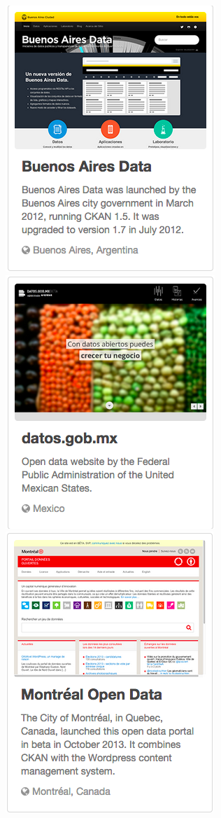 \includegraphics{Images/BuenosAiresOpenData} \\
\includegraphics{Images/MexicoOpenData} \\
\includegraphics{Images/MontrealOpenData} \\
